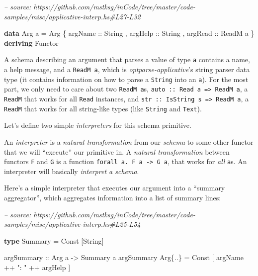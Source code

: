 \documentclass[]{article}
\newenvironment{Shaded}{}{}
\newcommand{\CommentTok}[1]{\textcolor[rgb]{0.38,0.63,0.69}{\textit{#1}}}
\newcommand{\DataTypeTok}[1]{\textcolor[rgb]{0.56,0.13,0.00}{#1}}
\newcommand{\FunctionTok}[1]{\textcolor[rgb]{0.02,0.16,0.49}{#1}}
\newcommand{\KeywordTok}[1]{\textcolor[rgb]{0.00,0.44,0.13}{\textbf{#1}}}
\newcommand{\NormalTok}[1]{#1}
\newcommand{\OtherTok}[1]{\textcolor[rgb]{0.00,0.44,0.13}{#1}}
\newcommand{\StringTok}[1]{\textcolor[rgb]{0.25,0.44,0.63}{#1}}
\begin{document}
\begin{Shaded}
\begin{Highlighting}[]
\CommentTok{-- source: https://github.com/mstksg/inCode/tree/master/code-samples/misc/applicative-interp.hs#L27-L32}

\KeywordTok{data} \DataTypeTok{Arg}\NormalTok{ a }\FunctionTok{=} \DataTypeTok{Arg}
\NormalTok{    \{}\OtherTok{ argName  ::} \DataTypeTok{String}
\NormalTok{    ,}\OtherTok{ argHelp  ::} \DataTypeTok{String}
\NormalTok{    ,}\OtherTok{ argRead  ::} \DataTypeTok{ReadM}\NormalTok{ a}
\NormalTok{    \}}
  \KeywordTok{deriving} \DataTypeTok{Functor}
\end{Highlighting}
\end{Shaded}

A schema describing an argument that parses a value of type \texttt{a} contains
a name, a help message, and a \texttt{ReadM\ a}, which is
\emph{optparse-applicative}'s string parser data type (it contains information
on how to parse a \texttt{String} into an \texttt{a}). For the most part, we
only need to care about two \texttt{ReadM\ a}s,
\texttt{auto\ ::\ Read\ a\ =\textgreater{}\ ReadM\ a}, a \texttt{ReadM} that
works for all \texttt{Read} instances, and
\texttt{str\ ::\ IsString\ s\ =\textgreater{}\ ReadM\ a}, a \texttt{ReadM} that
works for all string-like types (like \texttt{String} and \texttt{Text}).

Let's define two simple \emph{interpreters} for this schema primitive.

An \emph{interpreter} is a \emph{natural transformation} from our \emph{schema}
to some other functor that we will ``execute'' our primitive in. A \emph{natural
transformation} between functors \texttt{F} and \texttt{G} is a function
\texttt{forall\ a.\ F\ a\ -\textgreater{}\ G\ a}, that works for \emph{all}
\texttt{a}s. An interpreter will basically \emph{interpret a schema}.

Here's a simple interpreter that executes our argument into a ``summary
aggregator'', which aggregates information into a list of summary lines:

\begin{Shaded}
\begin{Highlighting}[]
\CommentTok{-- source: https://github.com/mstksg/inCode/tree/master/code-samples/misc/applicative-interp.hs#L25-L54}

\KeywordTok{type} \DataTypeTok{Summary} \FunctionTok{=} \DataTypeTok{Const}\NormalTok{ [}\DataTypeTok{String}\NormalTok{]}

\OtherTok{argSummary ::} \DataTypeTok{Arg}\NormalTok{ a }\OtherTok{->} \DataTypeTok{Summary}\NormalTok{ a}
\NormalTok{argSummary }\DataTypeTok{Arg}\NormalTok{\{}\FunctionTok{..}\NormalTok{\} }\FunctionTok{=} \DataTypeTok{Const}\NormalTok{ [ argName }\FunctionTok{++} \StringTok{": "} \FunctionTok{++}\NormalTok{ argHelp ]}
\end{Highlighting}
\end{Shaded}
\end{document}
